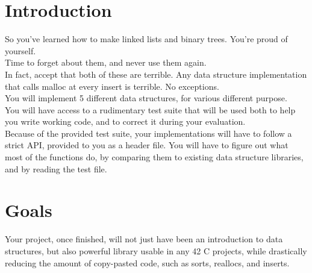 \documentclass{42-en}
\begin{document}
\chapter{Introduction}

    So you've learned how to make linked lists and binary trees. You're proud of yourself.\\

    Time to forget about them, and never use them again.\\

    In fact, accept that both of these are terrible. Any data structure
    implementation that calls malloc at every insert is terrible. No exceptions.\\

    You will implement 5 different data structures, for various different purpose.\\

    You will have access to a rudimentary test suite that will be used both to help you
    write working code, and to correct it during your evaluation.\\

    Because of the provided test suite, your implementations will have to follow a strict
    API, provided to you as a header file. You will have to figure out what most
    of the functions do, by comparing them to existing data structure libraries,
    and by reading the test file.\\


\chapter{Goals}

    Your project, once finished, will not just have been an introduction to data structures,
    but also powerful library usable in any 42 C projects, while drastically reducing
    the amount of copy-pasted code, such as sorts, reallocs, and inserts.\\
\end{document}
